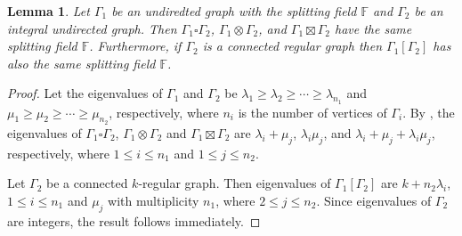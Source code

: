 \documentclass[12pt,a4paper]{article}
\newtheorem{lem}[thm]{Lemma}
\def \leq {\leqslant}
\def \geq {\geqslant}
\begin{document}
	\begin{lem}\label{productmain}
		Let $\Gamma_1$ be an undiredted graph with the splitting field $\mathbb F$ and $\Gamma_2$ be an integral undirected graph. Then $\Gamma_1\square\Gamma_2$, $\Gamma_1\otimes\Gamma_2$, and $\Gamma_1\boxtimes\Gamma_2$  have the same splitting field $\mathbb F$. Furthermore, if $\Gamma_2$ is a connected regular graph then $\Gamma_1[\Gamma_2]$ has also the same splitting field $\mathbb F$.
	\end{lem}
	\begin{proof}
		Let the eigenvalues of $\Gamma_1$ and $\Gamma_2$ be $\lambda_1\geq \lambda_2\geq\cdots\geq\lambda_{n_1}$ and $\mu_1\geq \mu_2\geq\cdots\geq\mu_{n_2}$, respectively, where $n_i$ is the number of vertices of $\Gamma_i$. By \cite[Table 4]{BKPS}, the eigenvalues of $\Gamma_1\square\Gamma_2$, $\Gamma_1\otimes\Gamma_2$ and $\Gamma_1\boxtimes\Gamma_2$ are $\lambda_i+\mu_j$, $\lambda_i\mu_j$, and $\lambda_i+\mu_j+\lambda_i\mu_j$, respectively, where $1\leq i\leq n_1$ and $1\leq j\leq n_2$. 
		
		Let $\Gamma_2$ be a connected $k$-regular graph. Then eigenvalues of $\Gamma_1[\Gamma_2]$ are $k+n_2\lambda_i$, $1\leq i\leq n_1$ and $\mu_j$ with multiplicity $n_1$, where $2\leq j\leq n_2$. Since eigenvalues of $\Gamma_2$ are integers, the result follows immediately.
	\end{proof}
	
\end{document}
